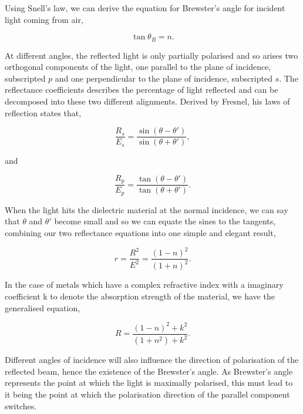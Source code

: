 \documentclass{article}
\begin{document}
Using Snell's law, we can derive the equation for Brewster's angle for incident light 
coming from air,

\begin{equation} \label{eq:brewsters}
    \tan{\theta_B} = n.
\end{equation}

At different angles, the reflected light is only partially polarised and so arises 
two orthogonal components of the light, one parallel to the plane of incidence, 
subscripted $p$ and one perpendicular to the plane of incidence, subscripted $s$. The 
reflectance coefficients describes the percentage of light reflected and can be decomposed 
into these two different alignments. Derived by Fresnel, his laws of reflection states that,

\begin{equation} \label{eq:Fresnels}
    \frac{R_s}{E_s} = \frac{\sin{(\theta - \theta')}}{\sin{(\theta + \theta')}},
\end{equation}

and

\begin{equation} \label{eq:Fresnelp}
    \frac{R_p}{E_p} = \frac{\tan{(\theta - \theta')}}{\tan{(\theta + \theta')}}.
\end{equation}

When the light hits the dielectric material at the normal incidence, we can say that 
$\theta$ and $\theta'$ become small and so we can equate the sines to the tangents, 
combining our two reflectance equations into one simple and elegant result,

\begin{equation}
    r = \frac{R^2}{E^2} = \frac{(1-n)^2}{(1+n)^2}.
\end{equation}

In the case of metals which have a complex refractive index with a imaginary coefficient 
k to denote the absorption strength of the material, we have the generalised equation,

\begin{equation} \label{eq:reflectance}
    R = \frac{(1-n)^2+k^2}{(1+n^2)+k^2}.
\end{equation}

Different angles of incidence will also influence the direction of polarisation of the 
reflected beam, hence the existence of the Brewster's angle. As Brewster's angle represents
the point at which the light is maximally polarised, this must lead to it being the point 
at which the polarisation direction of the parallel component switches.
\end{document}
